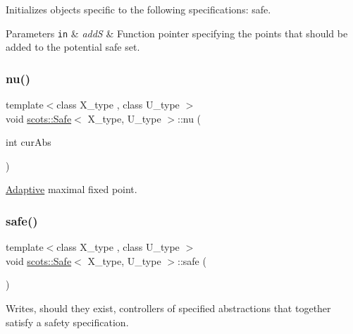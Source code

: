 Initializes objects specific to the following specifications\+: safe. 
\begin{DoxyParams}[1]{Parameters}
\mbox{\tt in}  & {\em addS} & Function pointer specifying the points that should be added to the potential safe set. \\
\hline
\end{DoxyParams}
\mbox{\label{classscots_1_1Safe_ac9f2578f6b74602510ca5db4b2ef31b9}} 
\subsubsection{\texorpdfstring{nu()}{nu()}}
{\footnotesize\ttfamily template$<$class X\+\_\+type , class U\+\_\+type $>$ \\
void \hyperlink{classscots_1_1Safe}{scots\+::\+Safe}$<$ X\+\_\+type, U\+\_\+type $>$\+::nu (\begin{DoxyParamCaption}\item[{int}]{cur\+Abs }\end{DoxyParamCaption})\hspace{0.3cm}{\ttfamily [inline]}}

\hyperlink{classscots_1_1Adaptive}{Adaptive} maximal fixed point. \mbox{\label{classscots_1_1Safe_af5ea22ef6bd1f86dd1a6f7ef6e590492}} 
\subsubsection{\texorpdfstring{safe()}{safe()}}
{\footnotesize\ttfamily template$<$class X\+\_\+type , class U\+\_\+type $>$ \\
void \hyperlink{classscots_1_1Safe}{scots\+::\+Safe}$<$ X\+\_\+type, U\+\_\+type $>$\+::safe (\begin{DoxyParamCaption}{ }\end{DoxyParamCaption})\hspace{0.3cm}{\ttfamily [inline]}}

Writes, should they exist, controllers of specified abstractions that together satisfy a safety specification. \mbox{\label{classscots_1_1Safe_ab6866ae8860c91feb49467556f0a8598}} 
